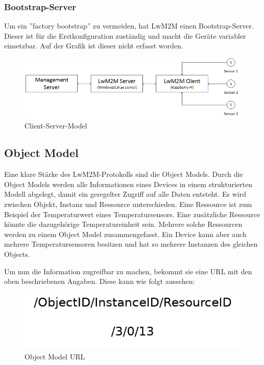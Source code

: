 \subsubsection{Bootstrap-Server}
Um ein ''factory bootstrap'' zu vermeiden, hat LwM2M einen Bootstrap-Server. Dieser ist für die Erstkonfiguration zuständig und macht die Geräte variabler einsetzbar. Auf der Grafik ist dieser nicht erfasst worden.
\begin{figure}[H]
\includegraphics[scale=0.5]{../02_Analyse/images/lwm2m/server_client_model.png}
\caption{Client-Server-Model}
\end{figure}
\newpage
\subsection{Object Model}
Eine klare Stärke des LwM2M-Protokolls sind die Object Models. Durch die Object Models werden alle Informationen eines Devices in einem strukturierten Modell abgelegt, damit ein geregelter Zugriff auf alle Daten entsteht. Es wird zwischen Objekt, Instanz und Ressource unterschieden. Eine Ressource ist zum Beispiel der Temperaturwert eines Temperatursensors. Eine zusätzliche Ressource könnte die dazugehörige Temperatureinheit sein. Mehrere solche Ressourcen werden zu einem Object Model zusammengefasst. Ein Device kann aber auch mehrere Temperatursensoren besitzen und hat so mehrere Instanzen des gleichen Objects.

Um nun die Information zugreifbar zu machen, bekommt sie eine URL mit den oben beschriebenen Angaben. Diese kann wie folgt aussehen:
\begin{figure}[H]
\includegraphics[scale=0.35]{../02_Analyse/images/lwm2m/url_example.png}
\caption{Object Model URL}
\end{figure}
